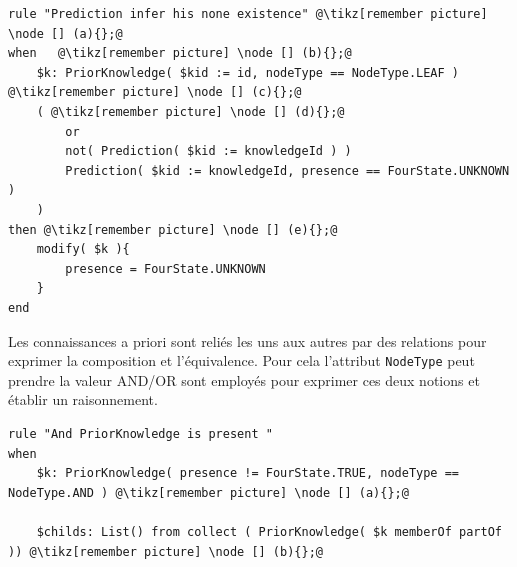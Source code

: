 \begin{refsegment}
\begin{lstlisting}[caption=Inférence de la prédiction d'absence, style=drl-style]
rule "Prediction infer his none existence" @\tikz[remember picture] \node [] (a){};@
when   @\tikz[remember picture] \node [] (b){};@
	$k: PriorKnowledge( $kid := id, nodeType == NodeType.LEAF )   @\tikz[remember picture] \node [] (c){};@
	( @\tikz[remember picture] \node [] (d){};@
		or
		not( Prediction( $kid := knowledgeId ) )
		Prediction( $kid := knowledgeId, presence == FourState.UNKNOWN )
	)
then @\tikz[remember picture] \node [] (e){};@
	modify( $k ){ 
		presence = FourState.UNKNOWN
	}
end
\end{lstlisting}

Les connaissances a priori sont reliés les uns aux autres par des relations pour exprimer la composition et l'équivalence. Pour cela l'attribut \texttt{NodeType} peut prendre la valeur AND/OR sont employés pour exprimer ces deux notions et établir un raisonnement.

\begin{lstlisting}[caption=Inférence de la prédiction de présence à travers les connaissances, style=drl-style]
rule "And PriorKnowledge is present "
when
	$k: PriorKnowledge( presence != FourState.TRUE, nodeType == NodeType.AND ) @\tikz[remember picture] \node [] (a){};@
	
	$childs: List() from collect ( PriorKnowledge( $k memberOf partOf )) @\tikz[remember picture] \node [] (b){};@
	

\end{lstlisting}
\end{refsegment}
